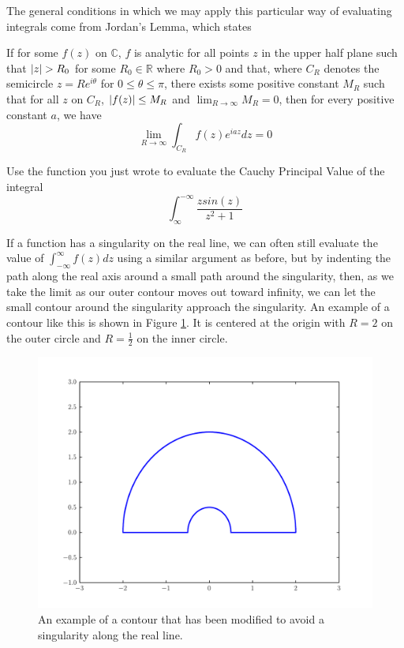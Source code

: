 The general conditions in which we may apply this particular way of evaluating integrals come from Jordan's Lemma, which states
\begin{lemma}
If for some $f(z)$ on $\mathbb{C}$, $f$ is analytic for all points $z$ in the upper half plane such that $\left\lvert z\right\rvert>R_0$ for some $R_0 \in \mathbb{R}$ where $R_0 >0$ and that, where $C_R$ denotes the semicircle $z=Re^{i\theta}$ for $0\leq \theta \leq \pi$, there exists some positive constant $M_R$ such that for all $z$ on $C_R$, $\left\lvert f(z)\right\rvert \leq M_R$ and $\lim_{R \to \infty} M_R = 0$, then for every positive constant $a$, we have
$$\lim_{R \to \infty} \int_{C_R} f(z) e^{iaz} dz = 0$$
\end{lemma}
\begin{problem}
Use the function you just wrote to evaluate the Cauchy Principal Value of the integral
$$\int_{\infty}^{-\infty} \frac{z sin(z)}{z^2+1}$$
\end{problem}

If a function has a singularity on the real line, we can often still evaluate the value of $\int_{-\infty}^{\infty} f(z) dz$ using a similar argument as before, but by indenting the path along the real axis around a small path around the singularity, then, as we take the limit as our outer contour moves out toward infinity, we can let the small contour around the singularity approach the singularity.
An example of a contour like this is shown in Figure \ref{complexint:c2}.
It is centered at the origin with $R=2$ on the outer circle and $R=\frac{1}{2}$ on the inner circle.

\begin{figure}
\includegraphics[width=\textwidth]{contour2.pdf}
\caption{An example of a contour that has been modified to avoid a singularity along the real line.}
\label{complexint:c2}
\end{figure}

